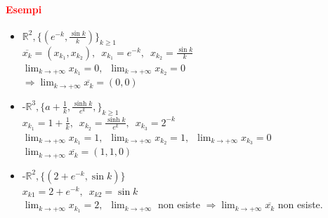 \documentclass{article}
\newcommand{\R}{\mathbb{R}}
\begin{document}
\paragraph{\textcolor{red}{Esempi}}
\begin{itemize}
    \item $\R^2, \{(e^{-k}, \frac{\sin k}{k})\}_{k \geq 1}$\\
        $\overline{x_k}=(x_{k_1},x_{k_2}), \,\,\, x_{k_1}=e^{-k}, \,\,\, x_{k_2}=\frac{\sin k}{k}$\\
        $\lim_{k \rightarrow +\infty} x_{k_1}=0, \,\,\, \lim_{k \rightarrow +\infty} x_{k_2}=0$\\
        $\Rightarrow \lim_{k \rightarrow + \infty} \overline{x_k} =(0,0)$
    \item -$\R^3, \{ a+\frac{1}{k}, \frac{\sinh k}{e^k}, \}_{k \geq 1}$\\
        $x_{k_1}=1+\frac{1}{k}, \,\,\, x_{k_2}=\frac{\sinh k}{e^k},\,\,\, x_{k_3}=2^{-k}$\\
        $\lim_{k \rightarrow +\infty}x_{k_1}=1, \,\,\, \lim_{k \rightarrow +\infty} x_{k_2}=1, \,\,\, \lim_{k \rightarrow +\infty} x_{k_3}=0 $\\
        $\lim_{k \rightarrow +\infty} \overline{x_k} =(1,1,0)$
    \item
        -$\R^2, \{(2+e^{-k}, \sin k)\} $\\
        $x_{k1}=2+e^{-k},\,\,\, x_{k2}=\sin k$\\
        $\lim_{k \rightarrow +\infty}x_{k_1}=2, \,\,\, \lim_{k \rightarrow +\infty}$ non esiste $\Rightarrow \lim_{k \rightarrow +\infty} \overline{x_k}$ non esiste.
\end{itemize}
\end{document}
